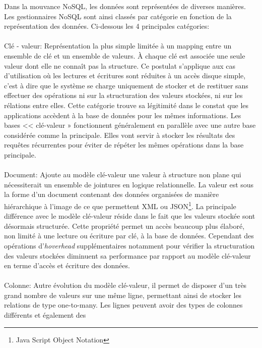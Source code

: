 Dans la mouvance \textsf{NoSQL}, les données sont représentées de
diverses manières. Les gestionnaires \textsf{NoSQL} sont ainsi classés par catégorie en fonction de la représentation des données. Ci-dessous les 4 principales catégories: 
\\\\ 
\textsf{Clé - valeur}: Représentation la plus simple limitée à un mapping entre un ensemble de clé et un ensemble de valeurs. À chaque clé est associée une seule valeur dont elle ne connaît pas la structure. Ce postulat s'applique aux cas d'utilisation où les lectures et écritures sont réduites à un accès disque simple, c'est à dire que le système se charge uniquement de stocker et de restituer sans effectuer des opérations ni sur la structuration des valeurs stockées, ni sur les rélations entre elles. Cette catégorie trouve sa légitimité dans le constat que les applications accèdent à la base de données pour les mêmes informations. Les bases << clé-valeur » fonctionnent généralement en parallèle avec une autre base considérée comme la principale. Elles vont servir à stocker les résultats des requêtes récurrentes pour éviter de répéter les mêmes opérations dans la base principale\cite{cleValeur}.  
\\
\\ 
{\sf Document}:
Ajoute au modèle \textsf{clé-valeur} une valeur à structure non plane qui nécessiterait un ensemble de jointures en logique relationnelle. La valeur est sous la forme d'un document contenant des données organisées de manière hiérarchique à l’image de ce que permettent
\textsf{XML} ou \textsf{JSON}\footnote{Java Script Object Notation}. La principale différence avec le modèle \textsf{clé-valeur} réside dans le fait que les valeurs stockée sont désormais structurée. Cette propriété permet un accès beaucoup plus élaboré, non limité à une lecture ou écriture par clé, à la base de données. Cependant des opérations d'\textit{hoverhead} supplémentaires notamment pour vérifier la structuration des valeurs stockées diminuent sa performance par rapport au modèle \textsf{clé-valeur} en terme d'accès et écriture des données. 
\\
\\ 
{\sf Colonne}: Autre évolution du modèle clé-valeur, il permet de
disposer d'un très grand nombre de valeurs sur une même ligne,
permettant ainsi de stocker les relations de type one-to-many. Les
lignes peuvent avoir des types de colonnes différents et également des
